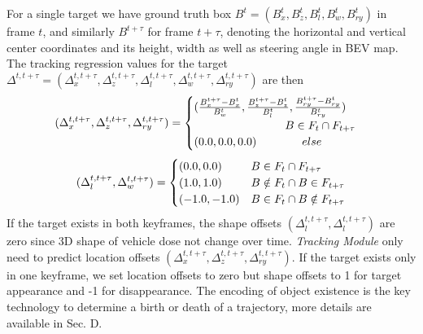 \documentclass[letterpaper, 10 pt, conference]{ieeeconf}  %
\begin{document}
For a single target we have ground truth box $B^t = (B^t_x,B^t_z,B^t_l, B^t_w, B^t_{ry})$ in frame $t$, and similarly $B^{t+\tau}$ for frame $t+\tau$, denoting the horizontal and vertical center coordinates and its height, width as well as steering angle in BEV map. The tracking regression values for the target $\Delta^{t, t+\tau} = (\Delta^{t,t+\tau}_{x}, \Delta^{t,t+\tau}_{z}, \Delta^{t,t+\tau}_{l}, \Delta^{t,t+\tau}_{w}, \Delta^{t,t+\tau}_{ry})$ are then
\begin{equation}
\small
(\Delta_{x}^{t, t+\tau}, \Delta_{z}^{t, t+\tau}, \Delta_{ry}^{t, t+\tau}) = 
\begin{cases}
(\frac{B_{x}^{t+\tau} - B_{x}^{t}}{B^t_{w}}, \frac{B_{z}^{t+\tau} - B_{z}^{t} }{B^t_{l}}, \frac{B_{ry}^{t+\tau} - B_{ry}^{t}}{B^t_{ry}}) \\
\text{\qquad \qquad \qquad \qquad} B \in F_t \cap F_{t+\tau} \\
(0.0,0.0, 0.0) \text{\qquad \qquad }  else
\end{cases}
\end{equation}
\begin{equation}
\small
(\Delta_{l}^{t, t+\tau}, \Delta_{w}^{t, t+\tau}) = 
\begin{cases}
(0.0,0.0) & B \in F_t \cap F_{t+\tau} \\
(1.0, 1.0) & B \notin F_t \cap B \in F_{t+\tau} \\
(-1.0, -1.0) & B \in F_t \cap B \notin F_{t+\tau}
\end{cases}
\end{equation}
If the target exists in both keyframes, the shape offsets $(\Delta^{t,t+\tau}_{l}, \Delta^{t,t+\tau}_{l})$ are zero since 3D shape of vehicle dose not change over time. \textit{Tracking Module} only need to predict location offsets $(\Delta^{t,t+\tau}_{x}, \Delta^{t,t+\tau}_{z}, \Delta^{t,t+\tau}_{ry})$. If the target exists only in one keyframe, we set location offsets to zero but shape offsets to 1 for target appearance and -1 for disappearance. The encoding of object existence is the key technology to determine a birth or death of a trajectory, more details are available in Sec. D.


\end{document}
